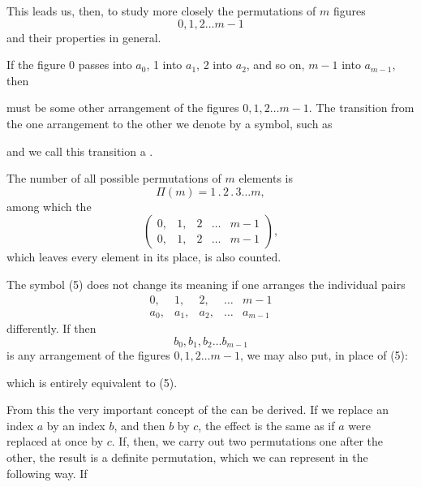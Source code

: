 
This leads us, then, to study more closely the permutations of $m$ figures
\[
0, 1, 2 \ldots m-1
\]
and their properties in general.

If the figure 0 passes into $a_0$, 1 into $a_1$, 2 into $a_2$, and so on, $m-1$ into
$a_{m-1}$, then


must be some other arrangement of the figures $0, 1, 2 \ldots m-1$. The
transition from the one arrangement to the other we denote by
a symbol, such as


and we call this transition a .

The number of all possible permutations of $m$ elements is
\[
\Pi(m) = 1 \,.\, 2 \,.\, 3 \ldots m,
\]
among which the 
\[
\begin{pmatrix} 0, & 1, & 2 & \ldots & m-1 \\ 0, & 1, & 2 & \ldots & m-1 \end{pmatrix},
\]
which leaves every element in its place, is also counted.

The symbol (5) does not change its meaning if one arranges the individual
pairs
\[
\begin{array}{ccccc}
0, & 1, & 2, & \ldots & m-1 \\
a_0, & a_1, & a_2, & \ldots & a_{m-1}
\end{array}
\]
differently. If then
\[
b_0, b_1, b_2 \ldots b_{m-1}
\]
is any arrangement of the figures $0, 1, 2 \ldots m-1$, we may
also put, in place of (5):


which is entirely equivalent to (5).

From this the very important concept of the  can be derived. If we replace an index $a$ by an index
$b$, and then $b$ by $c$, the effect is the same as if $a$ were replaced
at once by $c$. If, then, we carry out two permutations one after
the other, the result is a definite permutation,
which we can represent in the following way. If
